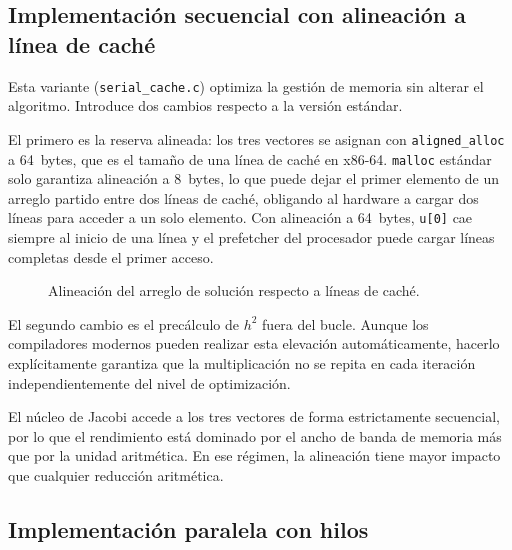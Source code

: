 \subsection{Implementación secuencial con alineación a línea de caché}

Esta variante (\texttt{serial\_cache.c}) optimiza la gestión de memoria sin alterar el algoritmo. Introduce dos cambios respecto a la versión estándar.

El primero es la reserva alineada: los tres vectores se asignan con \texttt{aligned\_alloc} a 64~bytes, que es el tamaño de una línea de caché en x86-64. \texttt{malloc} estándar solo garantiza alineación a 8~bytes, lo que puede dejar el primer elemento de un arreglo partido entre dos líneas de caché, obligando al hardware a cargar dos líneas para acceder a un solo elemento. Con alineación a 64~bytes, \texttt{u[0]} cae siempre al inicio de una línea y el prefetcher del procesador puede cargar líneas completas desde el primer acceso.

\begin{figure}[H]
\centering
{}
\caption{Alineación del arreglo de solución respecto a líneas de caché.}
\label{fig:cache_line_concepto}
\end{figure}

El segundo cambio es el precálculo de $h^2$ fuera del bucle. Aunque los compiladores modernos pueden realizar esta elevación automáticamente, hacerlo explícitamente garantiza que la multiplicación no se repita en cada iteración independientemente del nivel de optimización.

El núcleo de Jacobi accede a los tres vectores de forma estrictamente secuencial, por lo que el rendimiento está dominado por el ancho de banda de memoria más que por la unidad aritmética. En ese régimen, la alineación tiene mayor impacto que cualquier reducción aritmética.

\subsection{Implementación paralela con hilos}

